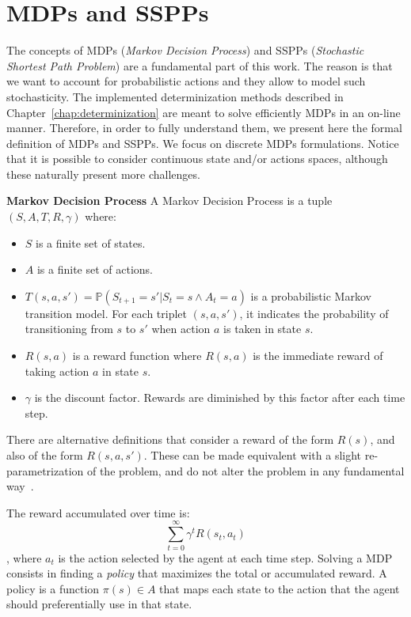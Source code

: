 \documentclass[../root.tex]{subfiles}
\begin{document}
\section{MDPs and SSPPs}

The concepts of MDPs (\emph{Markov Decision Process}) and SSPPs
(\emph{Stochastic Shortest Path Problem}) are a fundamental
part of this work. The reason is that we want to account for probabilistic
actions and they allow to model such stochasticity.
The implemented determinization methods described in
Chapter~\ref{chap:determinization} are meant to solve efficiently MDPs in an
on-line manner. Therefore, in order to fully understand them, we present
here the formal definition of MDPs and SSPPs. We focus on discrete MDPs
formulations. Notice that it is possible to consider continuous state
and/or actions spaces, although these naturally present more challenges.

\theoremstyle{definition}
\begin{definition}{\bfseries Markov Decision Process}
	A Markov Decision Process is a tuple $ (S, A, T, R, \gamma) $ where:
	\begin{itemize}
		\item $ S $ is a finite set of states.
		\item $ A $ is a finite set of actions.
		\item $ T(s,a,s') = \mathbb{P}(S_{t+1} = s' | S_t = s \land A_t=a) $ is
		a probabilistic Markov transition model. For each triplet
		$ (s, a, s') $, it indicates the probability of transitioning from $ s $
		to $ s' $ when action $ a $ is taken in state $ s $.
		\item $ R(s,a) $ is a reward function where $ R(s,a) $ is the immediate
		reward of taking action $ a $ in state $ s $.
		\item $ \gamma $ is the discount factor. Rewards are diminished
		by this factor after each time step.
	\end{itemize}
\end{definition}

There are alternative
definitions that consider a reward of the form $ R(s) $, and also of
the form $ R(s,a,s') $. These can be made
equivalent with a slight re-parametrization of the problem,
and do not alter the problem in any fundamental way~\cite{russell2016artificial}.

The reward accumulated over time is:
\[ \sum_{t=0}^\infty \gamma^t R(s_t, a_t) \],
where $ a_t $ is the action selected by the agent at each time step.
Solving a MDP consists in finding a \emph{policy} that maximizes the total or accumulated
reward. A policy is a function $ \pi (s) \in A $ that maps each state
to the action that the agent should preferentially use in that state.
\end{document}
